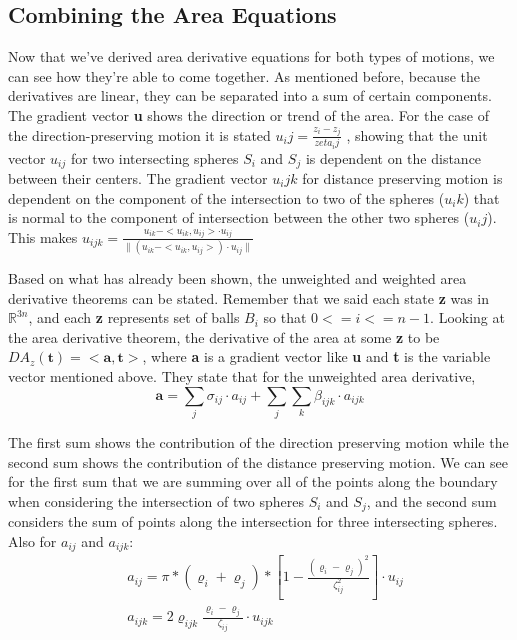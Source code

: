 \documentclass{article}
\newcommand{\R}{\mathbb{R}}
\begin{document}
\subsection{Combining the Area Equations}
Now that we've derived area derivative equations for both types of motions, we can see how they’re able to come together. As mentioned before, because the derivatives are linear, they can be separated into a sum of certain components. The gradient vector \textbf{u} shows the direction or trend of the area. For the case of the direction-preserving motion it is stated $u_ij = \frac{z_i - z_j}{zeta_ij}$ , showing that the unit vector $u_{ij}$ for two intersecting spheres $S_i$ and $S_j$ is dependent on the distance between their centers. The gradient vector $u_ijk$ for distance preserving motion is dependent on the component of the intersection to two of the spheres ($u_ik$) that is normal to the component of intersection between the other two spheres ($u_ij$). This makes $u_{ijk} = \frac{u_{ik} - <u_{ik},u_{ij}> \cdot u_{ij}}{\|(u_{ik} - <u_{ik},u_{ij}>) \cdot u_{ij}\|}$

Based on what has already been shown, the unweighted and weighted area derivative theorems can be stated. Remember that we said each state \textbf{z} was in $\R^{3n}$, and each \textbf{z} represents set of balls $B_i$ so that $0<=i<=n-1$. Looking at the area derivative theorem, the derivative of the area at some \textbf{z} to be $DA_z(\textbf{t}) = <\textbf{a},\textbf{t}>$, where \textbf{a} is a gradient vector like \textbf{u} and 	\textbf{t} is the variable vector mentioned above. They state that for the unweighted area derivative, 
\begin{equation}
\textbf{a} = \sum_j \sigma_{ij}\cdot a_{ij}+ \sum_j \sum_k \beta_{ijk}\cdot a_{ijk}
\end{equation}

The first sum shows the contribution of the direction preserving motion while the second sum shows the contribution of the distance preserving motion. We can see for the first sum that we are summing over all of the points along the boundary when considering the intersection of two spheres $S_i$ and $S_j$, and the second sum considers the sum of points along the intersection for three intersecting spheres. Also for $a_{ij}$ and $a_{ijk}$:
\begin{align*}
&a_{ij} = \pi*(\varrho_i+\varrho_j)*\left[1 - \frac{(\varrho_i - \varrho_j)^2}{\zeta_{ij}^2}\right]\cdot u_{ij}\\
&a_{ijk} = 2\varrho_{ijk}\frac{\varrho_i - \varrho_j}{\zeta_{ij}} \cdot u_{ijk}
\end{align*}
\end{document}
